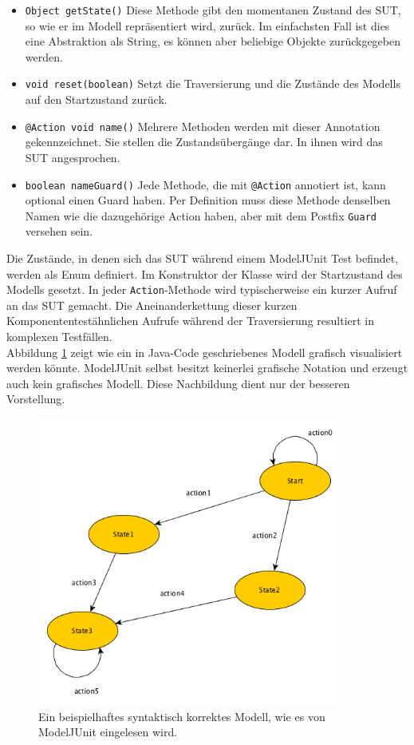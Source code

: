 \begin{itemize}
\item \texttt{Object getState()} Diese Methode gibt den momentanen Zustand des SUT, so wie er im Modell repräsentiert wird, zurück. Im einfachsten Fall ist dies eine Abstraktion als String, es können aber beliebige Objekte zurückgegeben werden.
\item \texttt{void reset(boolean)} Setzt die Traversierung und die Zustände des Modells auf den Startzustand zurück.
\item \texttt{@Action void name()} Mehrere Methoden werden mit dieser Annotation gekennzeichnet. Sie stellen die Zustandsübergänge dar. In ihnen wird das \Gls{SUT} angesprochen.
\item \texttt{boolean nameGuard()} Jede Methode, die mit \texttt{@Action} annotiert ist, kann optional einen Guard haben. Per Definition muss diese Methode denselben Namen wie die dazugehörige Action haben, aber mit dem Postfix \texttt{Guard} versehen sein.
\end{itemize}

Die Zustände, in denen sich das \Gls{SUT} während einem ModelJUnit Test befindet, werden als Enum definiert. Im Konstruktor der Klasse wird der Startzustand des Modells gesetzt. In jeder \texttt{Action}-Methode wird typischerweise ein kurzer Aufruf an das \Gls{SUT} gemacht. Die Aneinanderkettung dieser kurzen Komponententestähnlichen Aufrufe während der Traversierung resultiert in komplexen Testfällen.\\
Abbildung \ref{fig:modeljunit} zeigt wie ein in Java-Code geschriebenes Modell grafisch visualisiert werden könnte.  ModelJUnit selbst besitzt keinerlei grafische Notation und erzeugt auch kein grafisches Modell. Diese Nachbildung dient nur der besseren Vorstellung.

\begin{figure}[h] 
  \centering
     \includegraphics[width=0.9\textwidth]{figures/modelljunit_modell.png}
  \caption{Ein beispielhaftes syntaktisch korrektes Modell, wie es von ModelJUnit eingelesen wird.}
  \label{fig:modeljunit}
\end{figure}

